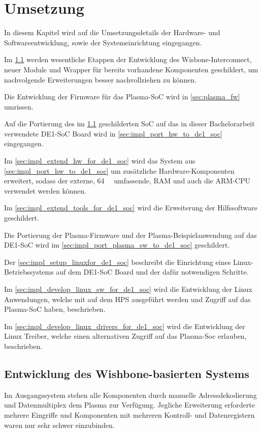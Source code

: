 \chapter{Umsetzung}
\label{cha:implementation}

In diesem Kapitel wird auf die Umsetzungsdetails der Hardware- und Softwareentwicklung, sowie der Systemeinrichtung eingegangen. 

Im \cref{sec:impl_wishbone} werden wesentliche Etappen der Entwicklung des Wisbone-\gls{Interconnect}, neuer Module und Wrapper für bereits vorhandene Komponenten geschildert, um nachvolgende Erweiterungen besser nachvollziehen zu können.

Die Entwicklung der Firmware für das Plasma-\gls{SoC} wird in \cref{sec:plasma_fw} umrissen.

Auf die Portierung des im \cref{sec:impl_wishbone} geschilderten \gls{SoC} auf das in dieser Bachelorarbeit verwendete DE1-SoC Board wird in \cref{sec:impl_port_hw_to_de1_soc} eingegangen. 

Im \cref{sec:impl_extend_hw_for_de1_soc} wird das System aus \cref{sec:impl_port_hw_to_de1_soc} um zusätzliche Hardware-Komponenten erweitert, sodass der externe, \SI{64}{\mega\byte} umfassende, \gls{RAM}  und auch die \gls{ARM}-\gls{CPU} verwendet werden können. 

Im \cref{sec:impl_extend_tools_for_de1_soc} wird die Erweiterung der Hilfssoftware geschildert.

Die Portierung der Plasma-Firmware und der Plasma-Beispielanwendung auf das DE1-SoC wird im \cref{sec:impl_port_plasma_sw_to_de1_soc} geschildert.

Der \cref{sec:impl_setup_linuxfor_de1_soc} beschreibt die Einrichtung eines Linux-Betriebssystems auf dem DE1-SoC Board und der dafür notwendigen Schritte. 

Im \cref{sec:impl_develop_linux_sw_for_de1_soc} wird die Entwicklung der Linux Anwendungen, welche mit auf dem \gls{HPS} ausgeführt werden und Zugriff auf das Plasma-\gls{SoC} haben, beschrieben.

Im \cref{sec:impl_develop_linux_drivers_for_de1_soc} wird die Entwicklung der Linux Treiber, welche einen alternativen Zugriff auf das Plasma-Soc erlauben, beschrieben.
\section{Entwicklung des Wishbone-basierten Systems}
\label{sec:impl_wishbone}

Im Ausgangssystem stehen alle Komponenten durch manuelle Adressdekodierung und Datenmultiplex dem Plasma zur Verfügung. Jegliche Erweiterung erforderte mehrere Eingriffe und Komponenten mit mehreren Kontroll- und Datenregistern waren nur sehr schwer einzubinden. 


